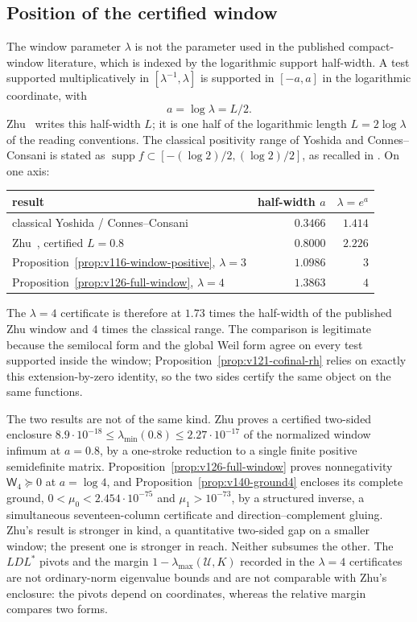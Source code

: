 \subsection*{Position of the certified window}
\label{sec:v141-window-position}
The window parameter $\lambda$ is not the parameter used in the
published compact-window literature, which is indexed by the
logarithmic support half-width. A test supported multiplicatively in
$[\lambda^{-1},\lambda]$ is supported in $[-a,a]$ in the logarithmic
coordinate, with
\[
 a=\log\lambda=L/2 .
\]
Zhu~\cite{Zhu2026} writes this half-width $L$; it is one half of the
logarithmic length $L=2\log\lambda$ of the reading conventions. The
classical positivity range of Yoshida and Connes--Consani is stated
as $\operatorname{supp}f\subset[-(\log2)/2,(\log2)/2]$, as recalled in
\cite{Zhu2026}. On one axis:
\begin{center}
\begin{tabular}{lrr}
\toprule
result & half-width $a$ & $\lambda=e^{a}$\\
\midrule
classical Yoshida / Connes--Consani & $0.3466$ & $1.414$\\
Zhu~\cite{Zhu2026}, certified $L=0.8$ & $0.8000$ & $2.226$\\
Proposition~\ref{prop:v116-window-positive}, $\lambda=3$ & $1.0986$ & $3$\\
Proposition~\ref{prop:v126-full-window}, $\lambda=4$ & $1.3863$ & $4$\\
\bottomrule
\end{tabular}
\end{center}
The $\lambda=4$ certificate is therefore at $1.73$ times the
half-width of the published Zhu window and $4$ times the classical
range. The comparison is legitimate because the semilocal form and the
global Weil form agree on every test supported inside the window;
Proposition~\ref{prop:v121-cofinal-rh} relies on exactly this
extension-by-zero identity, so the two sides certify the same object
on the same functions.

The two results are not of the same kind. Zhu proves a certified
two-sided enclosure
$8.9\cdot10^{-18}\le\lambda_{\min}(0.8)\le2.27\cdot10^{-17}$ of the
normalized window infimum at $a=0.8$, by a one-stroke reduction to a
single finite positive semidefinite matrix.
Proposition~\ref{prop:v126-full-window} proves nonnegativity
$\mathsf W_4\succeq0$ at $a=\log4$, and
Proposition~\ref{prop:v140-ground4} encloses its complete ground,
$0<\mu_0<2.454\cdot10^{-75}$ and $\mu_1>10^{-73}$, by a structured
inverse, a simultaneous seventeen-column certificate and
direction--complement gluing. Zhu's result is stronger in kind, a
quantitative two-sided gap on a smaller window; the present one is
stronger in reach. Neither subsumes the other. The $LDL^*$ pivots and
the margin $1-\lambda_{\max}(\mathcal U,K)$ recorded in the
$\lambda=4$ certificates are not ordinary-norm eigenvalue bounds and are not comparable with
Zhu's enclosure: the pivots depend on coordinates, whereas the relative
margin compares two forms.

